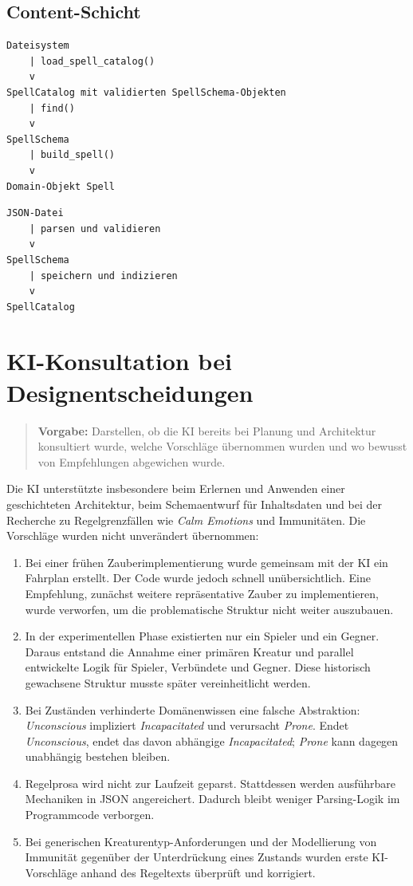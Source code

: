 \documentclass[
  12pt,
  a4paper,
  oneside,
  parskip=half,
  headings=normal
]{scrreprt}
\newcommand{\vorgabe}[1]{%
  \begin{quote}
    \small\color{hinweisfarbe}\textbf{Vorgabe:} #1
  \end{quote}
}
\begin{document}
\subsection{Content-Schicht}

\begin{lstlisting}[caption={Vom Dateisystem zum Domain-Zauber}]
Dateisystem
    | load_spell_catalog()
    v
SpellCatalog mit validierten SpellSchema-Objekten
    | find()
    v
SpellSchema
    | build_spell()
    v
Domain-Objekt Spell
\end{lstlisting}

\begin{lstlisting}[caption={Validierung und Indizierung}]
JSON-Datei
    | parsen und validieren
    v
SpellSchema
    | speichern und indizieren
    v
SpellCatalog
\end{lstlisting}

\section{KI-Konsultation bei Designentscheidungen}

\vorgabe{Darstellen, ob die KI bereits bei Planung und Architektur konsultiert
wurde, welche Vorschläge übernommen wurden und wo bewusst von Empfehlungen
abgewichen wurde.}

Die KI unterstützte insbesondere beim Erlernen und Anwenden einer geschichteten
Architektur, beim Schemaentwurf für Inhaltsdaten und bei der Recherche zu
Regelgrenzfällen wie \emph{Calm Emotions} und Immunitäten. Die Vorschläge
wurden nicht unverändert übernommen:

\begin{enumerate}
  \item Bei einer frühen Zauberimplementierung wurde gemeinsam mit der KI ein
        Fahrplan erstellt. Der Code wurde jedoch schnell unübersichtlich. Eine
        Empfehlung, zunächst weitere repräsentative Zauber zu implementieren,
        wurde verworfen, um die problematische Struktur nicht weiter
        auszubauen.
  \item In der experimentellen Phase existierten nur ein Spieler und ein
        Gegner. Daraus entstand die Annahme einer primären Kreatur und parallel
        entwickelte Logik für Spieler, Verbündete und Gegner. Diese historisch
        gewachsene Struktur musste später vereinheitlicht werden.
  \item Bei Zuständen verhinderte Domänenwissen eine falsche Abstraktion:
        \emph{Unconscious} impliziert \emph{Incapacitated} und verursacht
        \emph{Prone}. Endet \emph{Unconscious}, endet das davon abhängige
        \emph{Incapacitated}; \emph{Prone} kann dagegen unabhängig bestehen
        bleiben.
  \item Regelprosa wird nicht zur Laufzeit geparst. Stattdessen werden
        ausführbare Mechaniken in JSON angereichert. Dadurch bleibt weniger
        Parsing-Logik im Programmcode verborgen.
  \item Bei generischen Kreaturentyp-Anforderungen und der Modellierung von
        Immunität gegenüber der Unterdrückung eines Zustands wurden erste
        KI-Vorschläge anhand des Regeltexts überprüft und korrigiert.
\end{enumerate}
\end{document}

